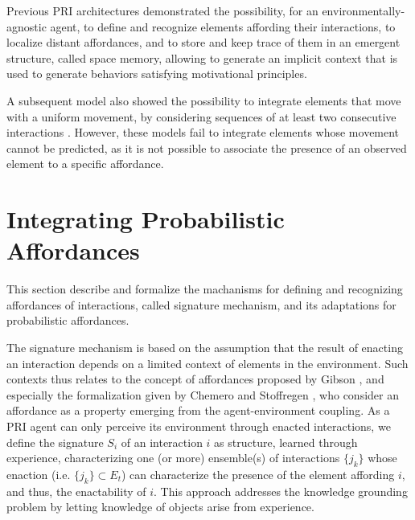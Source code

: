 \documentclass[conference]{IEEEtran}
\begin{document}
Previous PRI architectures demonstrated the possibility, for an environmentally-agnostic agent, to define and recognize elements affording their interactions, to localize distant affordances, and to store and keep trace of them in an emergent structure, called space memory, allowing to generate an implicit context that is used to generate behaviors satisfying motivational principles. 

A subsequent model also showed the possibility to integrate elements that move with a uniform movement, by considering sequences of at least two consecutive interactions \cite{gay:dynamic}. However, these models fail to integrate elements whose movement cannot be predicted, as it is not possible to associate the presence of an observed element to a specific affordance.



\section{Integrating Probabilistic Affordances}


This section describe and formalize the machanisms for defining and recognizing affordances of interactions, called signature mechanism, and its adaptations for probabilistic affordances.

The signature mechanism is based on the assumption that the result of enacting an interaction depends on a limited context of elements in the environment. Such contexts thus relates to the concept of affordances proposed by Gibson \cite{gibson:affordances}, and especially the formalization given by Chemero \cite{chemero:affordance} and Stoffregen \cite{stoffregen:affordance}, who consider an affordance as a property emerging from the agent-environment coupling. As a PRI agent can only perceive its environment through enacted interactions, we define the signature $S_i$ of an interaction $i$ as structure, learned through experience, characterizing one (or more) ensemble(s) of interactions $\{j_k\}$ whose enaction (i.e. $\{j_k\} \subset E_t$) can characterize the presence of the element affording $i$, and thus, the enactability of $i$.  This approach addresses the knowledge grounding problem \cite{harnad:grounding} by letting knowledge of objects arise from experience.
\end{document}
